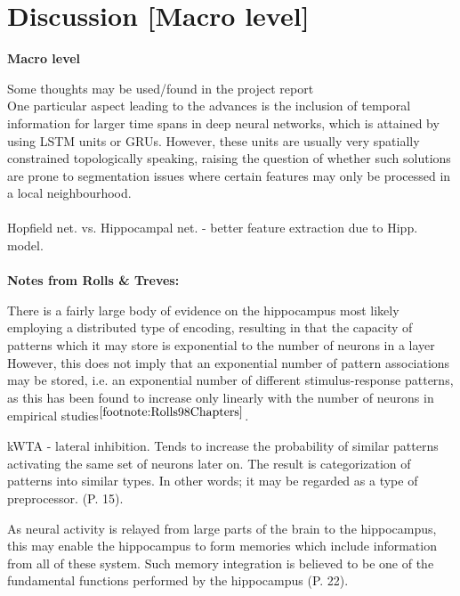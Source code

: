 
\chapter{Discussion [Macro level]}\label{chpt:discussion}
\textbf{Macro level}

Some thoughts may be used/found in the project report
\\

One particular aspect leading to the advances is the inclusion of temporal information for larger time spans in deep neural networks, which is attained by using LSTM units or GRUs. However, these units are usually very spatially constrained topologically speaking, raising the question of whether such solutions are prone to segmentation issues where certain features may only be processed in a local neighbourhood.
\\\\

Hopfield net. vs. Hippocampal net. - better feature extraction due to Hipp. model.
\\\\

\textbf{Notes from Rolls \& Treves:}

There is a fairly large body of evidence on the hippocampus most likely employing a distributed type of encoding, resulting in that the capacity of patterns which it may store is exponential to the number of neurons in a layer
However, this does not imply that an exponential number of pattern associations may be stored, i.e. an exponential number of different stimulus-response patterns, as this has been found to increase only linearly with the number of neurons in empirical studies$^{\ref{footnote:Rolls98Chapters}}$.

kWTA - lateral inhibition. Tends to increase the probability of similar patterns activating the same set of neurons later on. The result is categorization of patterns into similar types. In other words; it may be regarded as a type of preprocessor. (P. 15).

As neural activity is relayed from large parts of the brain to the hippocampus, this may enable the hippocampus to form memories which include information from all of these system. Such memory integration is believed to be one of the fundamental functions performed by the hippocampus (P. 22).

